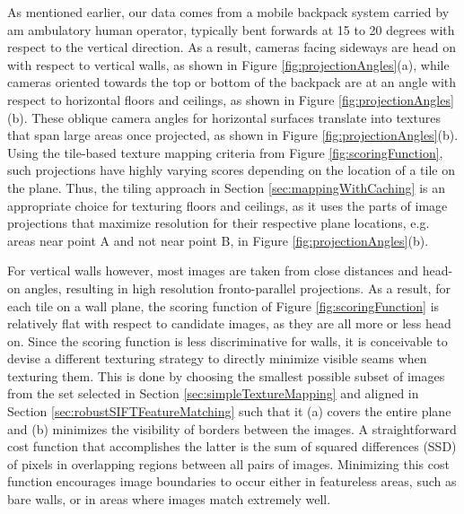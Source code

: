 \documentclass[]{spie}  %
\begin{document}
As mentioned earlier, our data comes from a mobile backpack system
carried by am ambulatory human operator, typically bent forwards at 15
to 20 degrees with respect to the vertical direction. As a result,
cameras facing sideways are head on with respect to vertical walls, as
shown in Figure \ref{fig:projectionAngles}(a), while cameras oriented
towards the top or bottom of the backpack are at an angle with respect
to horizontal floors and ceilings, as shown in Figure
\ref{fig:projectionAngles}(b). These oblique camera angles for
horizontal surfaces translate into textures that span large areas once
projected, as shown in Figure \ref{fig:projectionAngles}(b). Using the
tile-based texture mapping criteria from Figure
\ref{fig:scoringFunction}, such projections have highly varying scores
depending on the location of a tile on the plane. Thus, the tiling
approach in Section \ref{sec:mappingWithCaching} is an appropriate
choice for texturing floors and ceilings, as it uses the parts of
image projections that maximize resolution for their respective plane
locations, e.g. areas near point A and not near point B, in Figure
\ref{fig:projectionAngles}(b).


For vertical walls however, most images are taken from close distances
and head-on angles, resulting in high resolution fronto-parallel
projections. As a result, for each tile on a wall plane, the scoring
function of Figure \ref{fig:scoringFunction} is relatively flat with
respect to candidate images, as they are all more or less head
on. Since the scoring function is less discriminative for walls, it is
conceivable to devise a different texturing strategy to directly
minimize visible seams when texturing them. This is done by choosing
the smallest possible subset of images from the set selected in
Section \ref{sec:simpleTextureMapping} and aligned in Section
\ref{sec:robustSIFTFeatureMatching} such that it (a) covers the entire
plane and (b) minimizes the visibility of borders between the
images. A straightforward cost function that accomplishes the latter
is the sum of squared differences (SSD) of pixels in overlapping
regions between all pairs of images. Minimizing this cost function
encourages image boundaries to occur either in featureless areas, such
as bare walls, or in areas where images match extremely well.
\end{document}

